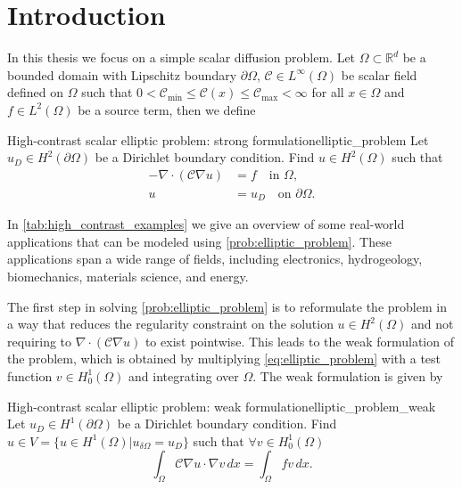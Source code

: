 \chapter{Introduction}\label{ch:introduction}
In this thesis we focus on a simple scalar diffusion problem. Let $\Omega\subset\mathbb{R}^d$ be a bounded domain with Lipschitz boundary $\partial\Omega$, $\mathcal{C}\in L^\infty(\Omega)$ be scalar field defined on $\Omega$ such that $0 < \mathcal{C}_{\min} \leq \mathcal{C}(x) \leq \mathcal{C}_{\max} < \infty$ for all $x\in\Omega$ and $f\in L^2(\Omega)$ be a source term, then we define
\begin{fancyprob}{High-contrast scalar elliptic problem: strong formulation}{elliptic_problem}
    Let $u_D\in H^2(\partial\Omega)$ be a Dirichlet boundary condition. Find $u\in H^2(\Omega)$ such that
    \begin{equation}
        \begin{aligned}
            -\nabla\cdot\left(\mathcal{C}\nabla u\right) & = f \quad \text{in } \Omega,           \\
            u                                       & = u_D \quad \text{on } \partial\Omega.
        \end{aligned}
        \label{eq:elliptic_problem}
    \end{equation}
\end{fancyprob}

In \cref{tab:high_contrast_examples} we give an overview of some real-world applications that can be modeled using \cref{prob:elliptic_problem}. These applications span a wide range of fields, including electronics, hydrogeology, biomechanics, materials science, and energy.


The first step in solving \cref{prob:elliptic_problem} is to reformulate the problem in a way that reduces the regularity constraint on the solution $u\in H^2(\Omega)$ and not requiring to $\nabla\cdot\left(\mathcal{C}\nabla u\right)$ to exist pointwise. This leads to the weak formulation of the problem, which is obtained by multiplying \cref{eq:elliptic_problem} with a test function $v\in H^1_0(\Omega)$ and integrating over $\Omega$. The weak formulation is given by
\begin{fancyprob}{High-contrast scalar elliptic problem: weak formulation}{elliptic_problem_weak}
    Let $u_D\in H^1(\partial\Omega)$ be a Dirichlet boundary condition. Find $u\in V = \{u\in H^1(\Omega) | u_{\delta \Omega} = u_D\}$ such that $\forall v \in H^1_0(\Omega)$
    \begin{equation}
        \label{eq:galerkin}
        \int_\Omega \mathcal{C}\nabla u\cdot\nabla v\,dx = \int_\Omega f v\,dx.
    \end{equation}
\end{fancyprob}

